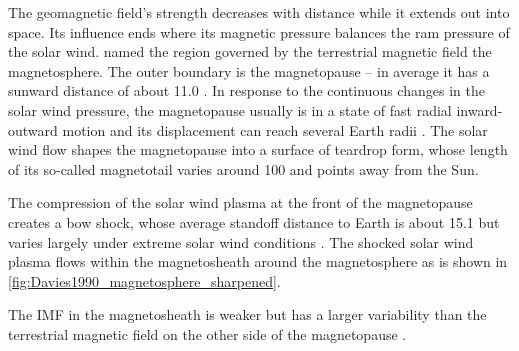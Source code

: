 The geomagnetic field's strength decreases with distance while it extends out into space. Its influence ends where its magnetic pressure balances the ram pressure of the solar wind. \citet{Gold1959} named the region governed by the terrestrial magnetic field the magnetosphere. The outer boundary is the magnetopause -- in average it has a sunward distance of about \SI{11.0}{\RE} \citep{Fairfield1971}. In response to the continuous changes in the solar wind pressure, the magnetopause usually is in a state of fast radial inward-outward motion and its displacement can reach several Earth radii \citep{DeKeyser2005}. The solar wind flow shapes the magnetopause into a surface of teardrop form, whose length of its so-called magnetotail varies around \SI{100}{\RE} and points away from the Sun.

The compression of the solar wind plasma at the front of the magnetopause creates a bow shock, whose average standoff distance to Earth is about \SI{15.1}{\RE} but varies largely under extreme solar wind conditions \citep{Fairfield1971}. The shocked solar wind plasma flows within the magnetosheath around the magnetosphere as is shown in \autoref{fig:Davies1990_magnetosphere_sharpened}.
\begin{figure}[t!]
\end{figure}
The IMF in the magnetosheath is weaker but has a larger variability than the terrestrial magnetic field on the other side of the magnetopause \citep{DeKeyser2005}.

